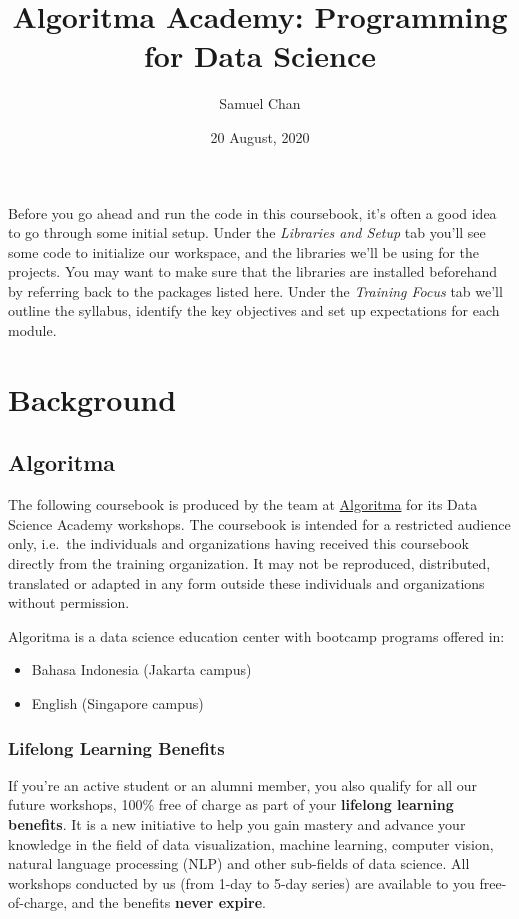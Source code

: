 \documentclass[]{article}
\title{Algoritma Academy: Programming for Data Science}
\author{Samuel Chan}
\date{20 August, 2020}
\providecommand{\tightlist}{%
  \setlength{\itemsep}{0pt}\setlength{\parskip}{0pt}}
\begin{document}
\maketitle

Before you go ahead and run the code in this coursebook, it's often a
good idea to go through some initial setup. Under the \emph{Libraries
and Setup} tab you'll see some code to initialize our workspace, and the
libraries we'll be using for the projects. You may want to make sure
that the libraries are installed beforehand by referring back to the
packages listed here. Under the \emph{Training Focus} tab we'll outline
the syllabus, identify the key objectives and set up expectations for
each module.

\hypertarget{background}{%
\section{Background}\label{background}}

\hypertarget{algoritma}{%
\subsection{Algoritma}\label{algoritma}}

The following coursebook is produced by the team at
\href{https://algorit.ma}{Algoritma} for its Data Science Academy
workshops. The coursebook is intended for a restricted audience only,
i.e.~the individuals and organizations having received this coursebook
directly from the training organization. It may not be reproduced,
distributed, translated or adapted in any form outside these individuals
and organizations without permission.

Algoritma is a data science education center with bootcamp programs
offered in:

\begin{itemize}
\tightlist
\item
  Bahasa Indonesia (Jakarta campus)\\
\item
  English (Singapore campus)
\end{itemize}

\hypertarget{lifelong-learning-benefits}{%
\subsubsection{Lifelong Learning
Benefits}\label{lifelong-learning-benefits}}

If you're an active student or an alumni member, you also qualify for
all our future workshops, 100\% free of charge as part of your
\textbf{lifelong learning benefits}. It is a new initiative to help you
gain mastery and advance your knowledge in the field of data
visualization, machine learning, computer vision, natural language
processing (NLP) and other sub-fields of data science. All workshops
conducted by us (from 1-day to 5-day series) are available to you
free-of-charge, and the benefits \textbf{never expire}.
\end{document}

